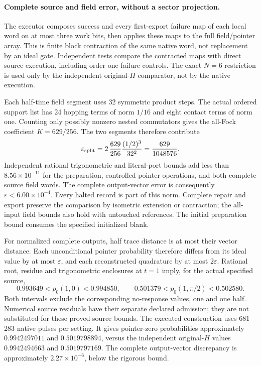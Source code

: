 \paragraph{Complete source and field error, without a sector projection.}
The executor composes success and every first-export failure map of each
local word on at most three work bits, then applies these maps to the full
field/pointer array.  This is finite block contraction of the same native
word, not replacement by an ideal gate.  Independent tests compare the
contracted maps with direct source execution, including order-one failure
controls.  The exact $N=6$ restriction is used only by the independent
original-$H$ comparator, not by the native execution.

Each half-time field segment uses 32 symmetric product steps.  The actual
ordered support list has 24 hopping terms of norm $1/16$ and eight contact
terms of norm one.  Counting only possibly nonzero nested commutators gives
the all-Fock coefficient $K=629/256$.  The two segments therefore contribute
\[
 \varepsilon_{\rm split}
 =2\,\frac{629}{256}\frac{(1/2)^3}{32^2}
 =\frac{629}{1048576}.
\]
Independent rational trigonometric and literal-port bounds add less than
$8.56\times10^{-11}$ for the preparation, controlled pointer operations,
and both complete source field words.  The complete output-vector error
is consequently $\varepsilon<6.00\times10^{-4}$.  Every halted record is
part of this norm.  Complete repair and export preserve the comparison by
isometric extension or contraction; the all-input field bounds also hold
with untouched references.  The initial preparation bound consumes the
specified initialized blank.

For normalized complete outputs, half trace distance is at most their
vector distance.  Each unconditional pointer probability therefore differs
from its ideal value by at most $\varepsilon$, and each reconstructed
quadrature by at most $2\varepsilon$.  Rational root, residue and
trigonometric enclosures at $t=1$ imply, for the actual specified source,
\[
 0.993649<p_0(1,0)<0.994850,\qquad
 0.501379<p_0(1,\pi/2)<0.502580.
\]
Both intervals exclude the corresponding no-response values, one and one
half.  Numerical source residuals have their separate declared admission;
they are not substituted for these proved source bounds.
The executed construction uses 681\,283 native pulses per setting.
It gives pointer-zero probabilities approximately $0.9942497011$ and
$0.5019798894$, versus the independent original-$H$ values
$0.9942494663$ and $0.5019797169$.  The complete output-vector discrepancy
is approximately $2.27\times10^{-6}$, below the rigorous bound.

